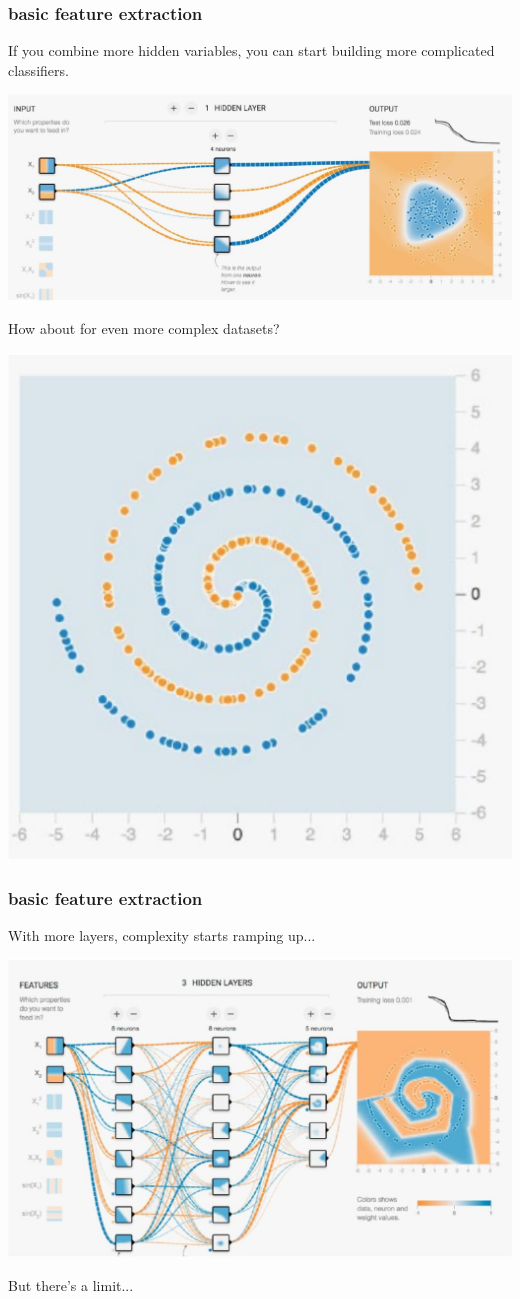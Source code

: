 \documentclass[handout,compress]{beamer}
\begin{document}
	\begin{frame}
	\frametitle{basic feature extraction}
	If you combine more hidden variables, you can start building more complicated classifiers.
	\begin{center}
		\includegraphics[width=.55\textwidth]{power1.png}
	\end{center}
How about for even more complex datasets?
\vspace{-.5em}
	\begin{center}
	\includegraphics[width=.3\textwidth]{spiral.png}
	\end{center}
	\end{frame}

	\begin{frame}
	\frametitle{basic feature extraction}
	With more layers, complexity starts ramping up...
	\begin{center}
		\includegraphics[width=.8\textwidth]{power2.png}
	\end{center}
But there's a limit...
	\end{frame}
\end{document}
